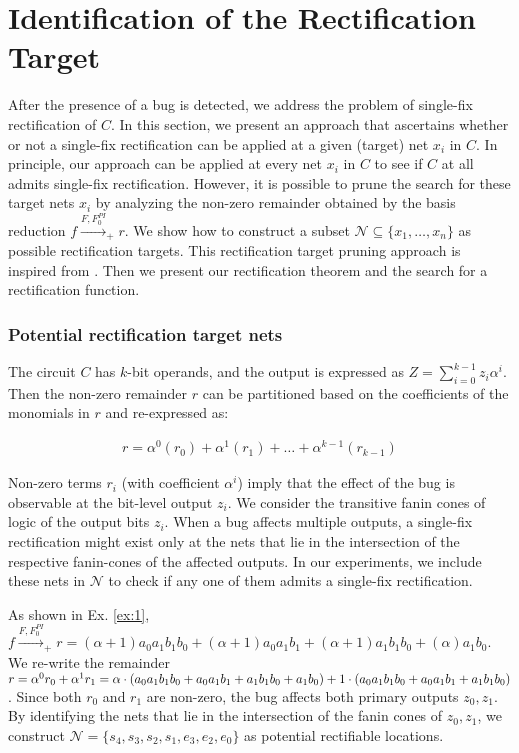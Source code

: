 \section{Identification of the Rectification Target}

After the presence of a bug is detected, we address the problem of
single-fix rectification of $C$. In this section, we present an
approach that ascertains whether or not a single-fix rectification can
be applied at a given (target) net $x_i$ in $C$. In principle, our
approach can be applied at every net $x_i$ in $C$ to see if $C$ at all
admits single-fix rectification. However, it is possible to 
prune the search for these target nets $x_i$ by
analyzing the non-zero remainder obtained by the \Grobner basis
reduction $f\xrightarrow{F,F_{0}^{PI}}_+r$. We show how to construct a subset
$\mathcal{N}\subseteq \{x_1,\dots,x_n\}$ as possible rectification
targets. This rectification target pruning approach is inspired from
\cite{farimah:2016:1}. 
Then we present our rectification theorem and the search for
a rectification function.

\subsubsection{Potential rectification target nets} The
circuit $C$ has $k$-bit operands, and the output is expressed as $Z =
\sum_{i=0}^{k-1} z_i \alpha^i$. Then the non-zero remainder $r$ can 
be partitioned based on the coefficients of the monomials in $r$ and
re-expressed as: %

\vspace{-0.1in}
\begin{align}
r = \alpha^0 (r_0) + \alpha^1 (r_1) + \dots + \alpha^{k-1} (r_{k-1})
\end{align}

Non-zero  terms $r_i$ (with coefficient $\alpha^i$) imply that the
effect of the bug is observable at the bit-level output $z_i$. We
consider the transitive fanin cones of logic of the output bits
$z_i$. When a bug affects multiple outputs, a single-fix rectification
might exist only at the nets that lie in the intersection of the
respective fanin-cones of the affected outputs. In our experiments, we
include these nets in $\mathcal{N}$ to check if any one of them admits
a single-fix rectification.

\begin{Example}
As shown in Ex. \ref{ex:1}, $f\xrightarrow{F,F_{0}^{PI}}_+r =
(\alpha+1)a_0a_1b_1b_0+(\alpha+1)a_0a_1b_1+(\alpha+1)a_1b_1b_0+(\alpha)a_1b_0$. We
re-write the remainder $r = \alpha^0 r_0 + \alpha^1 r_1 = 
\alpha\cdot (a_0a_1b_1b_0+a_0a_1b_1+a_1b_1b_0+a_1b_0) +
1\cdot (a_0a_1b_1b_0+a_0a_1b_1+a_1b_1b_0)$. Since both $r_0$ and $r_1$ are
non-zero, the bug affects both primary outputs $z_0, z_1$. By
identifying the nets that lie in the intersection of the fanin cones
of $z_0, z_1$, we construct $\mathcal{N} =
\{s_4,s_3,s_2,s_1,e_3,e_2,e_0\}$ as potential rectifiable locations.
\end{Example}


